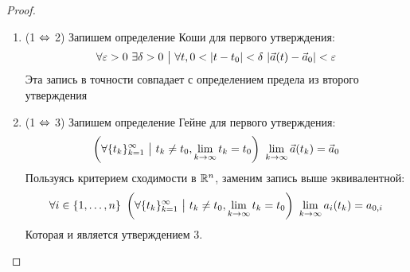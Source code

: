 \begin{proof}~
\begin{enumerate}
	\item (1 $\Leftrightarrow$ 2) Запишем определение Коши для первого утверждения:
	\[
		\forall \varepsilon > 0\ \exists \delta > 0 \ \big|\  \forall t, 0 < |t - t_0| < \delta\ |\vec{a}(t) - \vec{a}_0| < \varepsilon
	\]
	Эта запись в точности совпадает с определением предела из второго утверждения
	
	\item (1 $\Leftrightarrow$ 3) Запишем определение Гейне для первого утверждения:
	\[
		\left(\forall \{t_k\}_{k = 1}^\infty \ \big|\  t_k \neq t_0, \lim\limits_{k \to \infty} t_k = t_0\right)\ \lim\limits_{k \to \infty} \vec{a}(t_k) = \vec{a}_0
	\]
	Пользуясь критерием сходимости в $\mathbb{R}^n$, заменим запись выше эквивалентной:
	\[
		\forall i \in \{1, \ldots, n\}\ \left(\forall \{t_k\}_{k = 1}^\infty \ \big|\  t_k \neq t_0, \lim\limits_{k \to \infty} t_k = t_0\right)\ \lim\limits_{k \to \infty} a_i(t_k) = a_{0, i}
	\]
	Которая и является утверждением 3.
\end{enumerate}
\end{proof}